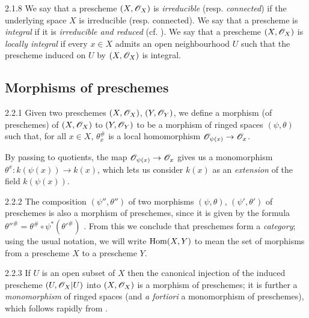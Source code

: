\documentclass[10pt,oneside]{book}
\begin{document}
\begin{env}{2.1.8}
\label{env-1.2.1.8}
We say that a prescheme $(X,\mathscr{O}_X)$ is \emph{irreducible}
(resp. \emph{connected}) if the underlying space $X$ is irreducible (resp.
connected).  We say that a prescheme is \emph{integral} if it is
\emph{irreducible and reduced} (cf. ).  We say that a prescheme
$(X,\mathscr{O}_X)$ is \emph{locally integral} if every $x\in X$ admits an open
neighbourhood $U$ such that the prescheme induced on $U$ by $(X,\mathscr{O}_X)$ is
integral.
\end{env}

\subsection{Morphisms of preschemes}
\label{1-schemes-2.2}

\begin{envs}[Definition]{2.2.1}
\label{defn-1.2.2.1}
Given two preschemes $(X,\mathscr{O}_X)$, $(Y,\mathscr{O}_Y)$, we
define a morphism (of preschemes) of $(X,\mathscr{O}_X)$ to $(Y,\mathscr{O}_Y)$ to be a morphism
of ringed spaces $(\psi,\theta)$ such that, for all $x\in X$, $\theta_x^\#$ is a
local homomorphism $\mathscr{O}_{\psi(x)}\to\mathscr{O}_x$.
\end{envs}

By passing to quotients, the map $\mathscr{O}_{\psi(x)}\to\mathscr{O}_x$ gives us a monomorphism
$\theta^x:k(\psi(x))\to k(x)$, which lets us consider $k(x)$ as an \emph{extension} of the
field $k(\psi(x))$.

\begin{env}{2.2.2}
\label{env-1.2.2.2}
The composition $(\psi'',\theta'')$ of two morphisms
$(\psi,\theta)$, $(\psi',\theta')$ of preschemes is also a morphism of
preschemes, since it is given by the formula
$\theta''^\#=\theta^\#\circ\psi^*(\theta'^\#)$ . From this
we conclude that preschemes form a \emph{category}; using the usual notation, we
will write ${\mathop{\mathrm{Hom}}\nolimits}(X,Y)$ to mean the set of morphisms from a prescheme $X$ to a
prescheme $Y$.
\end{env}

\begin{env}[Example]{2.2.3}
\label{exm-1.2.2.3}
If $U$ is an open subset of $X$ then the canonical
injection  of the induced prescheme $(U,\mathscr{O}_X|U)$ into
$(X,\mathscr{O}_X)$ is a morphism of preschemes; it is further a \emph{monomorphism} of
ringed spaces (and \emph{a fortiori} a monomorphism of preschemes), which
follows rapidly from .
\end{env}
\end{document}
